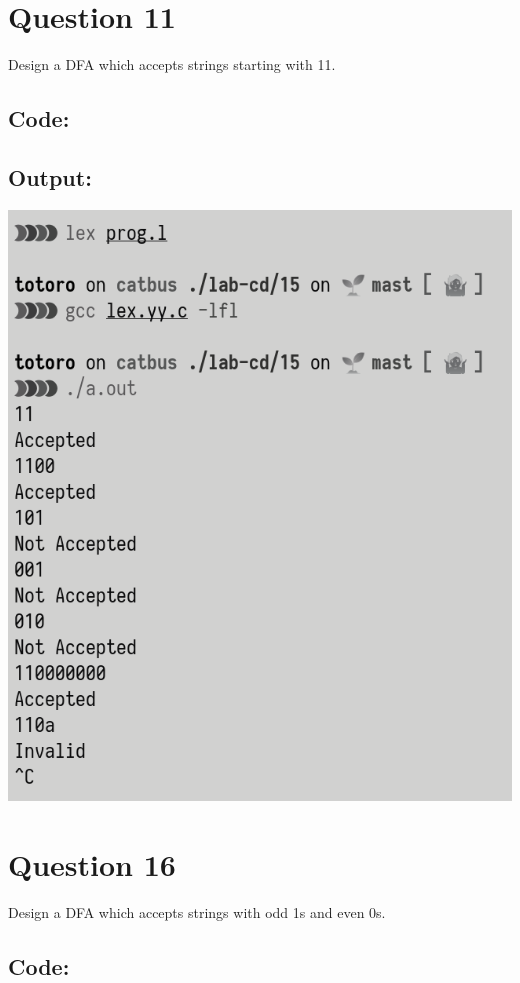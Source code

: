 \documentclass{article}
\begin{document}
\newpage
\section*{Question 11}
Design a DFA which accepts strings starting with 11.
\subsection*{Code:}

\newpage
\subsection*{Output:}
\begin{center}
  \includegraphics[width=14cm]{15/out.png}
\end{center}

\newpage
\section*{Question 16}
Design a DFA which accepts strings with odd 1s and even 0s.
\subsection*{Code:}

\newpage
\end{document}
